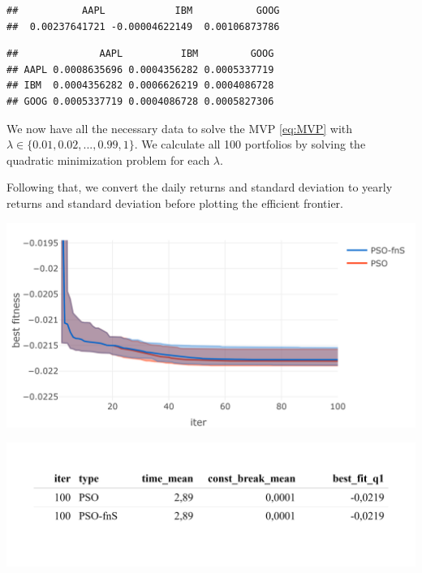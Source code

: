 \documentclass[
  oneside]{book}
\newenvironment{Shaded}{\begin{snugshade}}{\end{snugshade}}
\newcommand{\FunctionTok}[1]{\textcolor[rgb]{0.00,0.00,0.00}{#1}}
\newcommand{\NormalTok}[1]{#1}
\newcommand{\OtherTok}[1]{\textcolor[rgb]{0.56,0.35,0.01}{#1}}
\newcommand{\SpecialCharTok}[1]{\textcolor[rgb]{0.00,0.00,0.00}{#1}}
\begin{document}
\begin{verbatim}
##           AAPL            IBM           GOOG 
##  0.00237641721 -0.00004622149  0.00106873786
\end{verbatim}

\begin{Shaded}
\end{Shaded}

\begin{verbatim}
##              AAPL          IBM         GOOG
## AAPL 0.0008635696 0.0004356282 0.0005337719
## IBM  0.0004356282 0.0006626219 0.0004086728
## GOOG 0.0005337719 0.0004086728 0.0005827306
\end{verbatim}

We now have all the necessary data to solve the MVP \eqref{eq:MVP} with \(\lambda \in \{0.01, 0.02, ..., 0.99, 1\}\). We calculate all 100 portfolios by solving the quadratic minimization problem for each \(\lambda\).

Following that, we convert the daily returns and standard deviation to yearly returns and standard deviation before plotting the efficient frontier.

\includegraphics{Master_Thesis_files/figure-latex/unnamed-chunk-10-1.png}

\includegraphics{Master_Thesis_files/figure-latex/unnamed-chunk-11-1.png}
\end{document}
